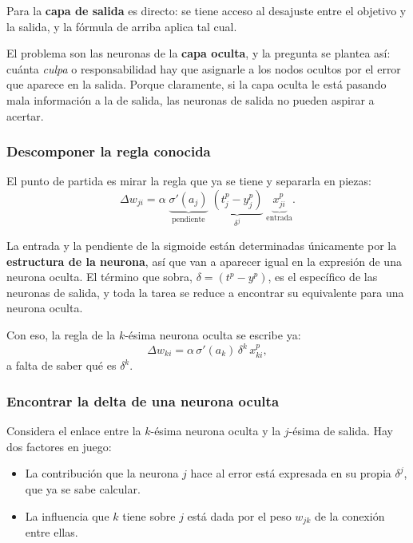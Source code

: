 \documentclass[11pt,letterpaper]{article}
\begin{document}
Para la \textbf{capa de salida} es directo: se tiene acceso al
desajuste entre el objetivo y la salida, y la fórmula de arriba
aplica tal cual.

El problema son las neuronas de la \textbf{capa oculta}, y la
pregunta se plantea así: cuánta \emph{culpa} o responsabilidad hay
que asignarle a los nodos ocultos por el error que aparece en la
salida. Porque claramente, si la capa oculta le está pasando mala
información a la de salida, las neuronas de salida no pueden aspirar
a acertar.

\subsubsection*{Descomponer la regla conocida}

El punto de partida es mirar la regla que ya se tiene y separarla en
piezas:
\[
    \Delta w_{ji} = \alpha\;
    \underbrace{\sigma'(a_j)}_{\text{pendiente}}\;
    \underbrace{(t_j^p - y_j^p)}_{\delta^j}\;
    \underbrace{x_{ji}^p}_{\text{entrada}} .
\]

La entrada y la pendiente de la sigmoide están determinadas
únicamente por la \textbf{estructura de la neurona}, así que van a
aparecer igual en la expresión de una neurona oculta. El término que
sobra, $\delta = (t^p - y^p)$, es el específico de las neuronas de
salida, y toda la tarea se reduce a encontrar su equivalente para una
neurona oculta.

Con eso, la regla de la $k$-ésima neurona oculta se escribe ya:
\[
    \Delta w_{ki} = \alpha\,\sigma'(a_k)\,\delta^k\,x_{ki}^p ,
\]
a falta de saber qué es $\delta^k$.

\subsubsection*{Encontrar la delta de una neurona oculta}

Considera el enlace entre la $k$-ésima neurona oculta y la
$j$-ésima de salida. Hay dos factores en juego:

\begin{itemize}[itemsep=0.25em]
  \item La contribución que la neurona $j$ hace al error está
        expresada en su propia $\delta^j$, que ya se sabe calcular.
  \item La influencia que $k$ tiene sobre $j$ está dada por el peso
        $w_{jk}$ de la conexión entre ellas.
\end{itemize}
\end{document}
